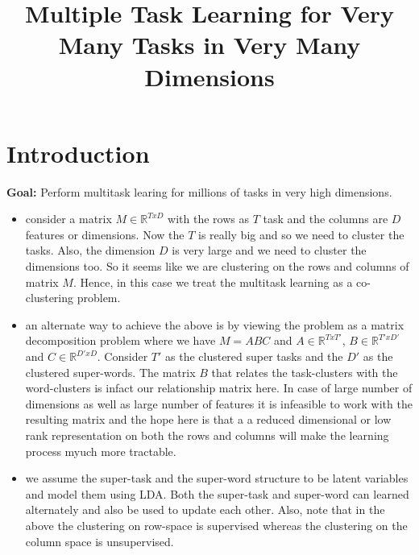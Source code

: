 \documentclass[10pts,fleqn]{article}
\title{Multiple Task Learning for Very Many Tasks in Very Many Dimensions}
\newenvironment{packeditemize}{
\begin{itemize}
  \setlength{\itemsep}{1pt}
  \setlength{\parskip}{-2pt}
  \setlength{\parsep}{-2pt}
}{\end{itemize}}
\begin{document}
\maketitle

\begin{abstract}
\end{abstract}



\section{Introduction}

{\bf Goal:} Perform multitask learing for millions of tasks in very high dimensions.

\begin{itemize}
	\item consider a matrix $M \in \mathbb{R}^{TxD}$ with the rows as $T$ task and the columns are $D$ features or dimensions. Now the $T$ is really big and so we need to cluster the tasks. Also, the dimension $D$ is very large and we need to cluster the dimensions too. So it seems like we are clustering on the rows and columns of matrix $M$. Hence, in this case we treat the multitask learning as a co-clustering problem.
	\item an alternate way to achieve the above is by viewing the problem as a matrix decomposition problem where we have $M = ABC$ and $A \in \mathbb{R}^{TxT'}$, $B \in \mathbb{R}^{T'xD'}$ and $C \in \mathbb{R}^{D'xD}$. Consider $T'$ as the clustered super tasks and the $D'$ as the clustered super-words. The matrix $B$ that relates the task-clusters with the word-clusters is infact our relationship matrix here. In case of large number of dimensions as well as large number of features it is infeasible to work with the resulting matrix and the hope here is that a a reduced dimensional or low rank representation on both the rows and columns will make the learning process myuch more tractable.
	\item we assume the super-task and the super-word structure to be latent variables and model them using LDA. Both the super-task and super-word can learned alternately and also be used to update each other. Also, note that in the above the clustering on row-space is supervised whereas the clustering on the column space is unsupervised.
\end{itemize}
\end{document}
